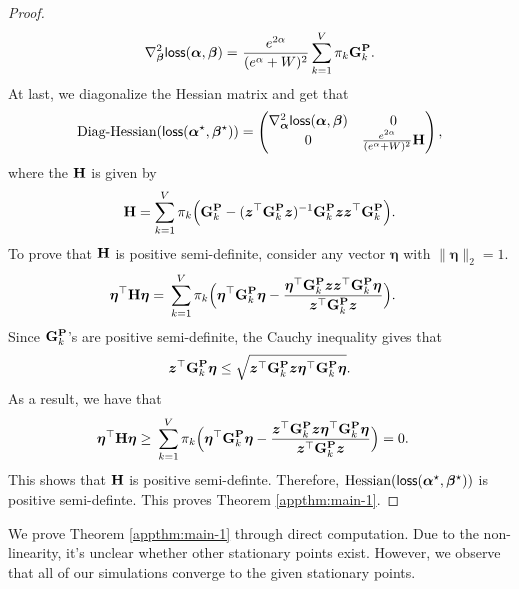 \begin{proof}
\begin{align*}
\nabla^2_{\boldsymbol{\beta}} \mathsf{loss}(\bm{\alpha},\boldsymbol{\beta}) = &~ \frac{ e^{2\alpha}}{(e^{\alpha}+W)^2} \sum_{k=1}^V  \pi_k {\mathbf G}^{\mathbf{P}}_k.\\
\end{align*}
At last, we diagonalize the Hessian matrix and get that
\[
\text{Diag-Hessian}(\mathsf{loss}(\bm{\alpha}^\star, \boldsymbol{\beta}^\star)) = \left(\begin{matrix}
\nabla^2_{\bm{\alpha}} \mathsf{loss}(\bm{\alpha},\boldsymbol{\beta}) & 0\\
0 & \frac{ e^{2\alpha}}{(e^{\alpha}+W)^2} {\mathbf H}\\
\end{matrix}\right),
\]
where the ${\mathbf H}$ is given by
\begin{align*}
{\mathbf H} = \sum_{k=1}^V  \pi_k \Big({\mathbf G}^{\mathbf{P}}_k - (\bm{z}^\top {\mathbf G}_k^{\mathbf{P}} \bm{z})^{-1}{\mathbf G}^{\mathbf{P}}_k\bm{z}\bm{z}^\top{\mathbf G}^{\mathbf{P}}_k\Big).
\end{align*}
To prove that ${\mathbf H}$ is positive semi-definite, consider any vector $\bm{\eta}$ with $\|\bm{\eta}\|_2=1$.
\begin{align*}
\bm{\eta}^\top {\mathbf H} \bm{\eta} = &~ \sum_{k=1}^V  \pi_k \Big(\bm{\eta}^\top{\mathbf G}^{\mathbf{P}}_k\bm{\eta} - \frac{\bm{\eta}^\top{\mathbf G}^{\mathbf{P}}_k\bm{z}\bm{z}^\top{\mathbf G}^{\mathbf{P}}_k\bm{\eta}}{\bm{z}^\top {\mathbf G}_k^{\mathbf{P}} \bm{z}}\Big).
\end{align*}
Since ${\mathbf G}^{\mathbf{P}}_k$'s are positive semi-definite, the Cauchy inequality gives that
\[
\bm{z}^\top{\mathbf G}^{\mathbf{P}}_k\bm{\eta} \leq \sqrt{\bm{z}^\top {\mathbf G}_k^{\mathbf{P}} \bm{z} \bm{\eta}^\top {\mathbf G}_k^{\mathbf{P}} \bm{\eta}}.
\]
As a result, we have that
\begin{align*}
\bm{\eta}^\top {\mathbf H} \bm{\eta} \geq &~ \sum_{k=1}^V  \pi_k \Big(\bm{\eta}^\top{\mathbf G}^{\mathbf{P}}_k\bm{\eta} - \frac{\bm{z}^\top {\mathbf G}_k^{\mathbf{P}} \bm{z} \bm{\eta}^\top {\mathbf G}_k^{\mathbf{P}} \bm{\eta}}{\bm{z}^\top {\mathbf G}_k^{\mathbf{P}} \bm{z}}\Big) = 0.
\end{align*}
This shows that ${\mathbf H}$ is positive semi-definte. Therefore, $\text{Hessian}(\mathsf{loss}(\bm{\alpha}^\star, \boldsymbol{\beta}^\star))$ is positive semi-definte. This proves Theorem \ref{appthm:main-1}.
\end{proof}
We prove Theorem \ref{appthm:main-1} through direct computation. Due to the non-linearity, it's unclear whether other stationary points exist. However, we observe that all of our simulations converge to the given stationary points. 
